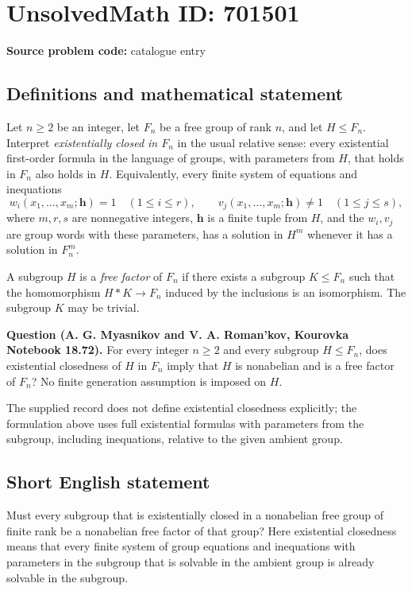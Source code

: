\documentclass[11pt]{article}
\begin{document}
\section*{UnsolvedMath ID: 701501}
\textbf{Source problem code:} catalogue entry
\subsection{Definitions and mathematical statement}
Let \(n\geq 2\) be an integer, let \(F_n\) be a free group of rank \(n\), and let \(H\leq F_n\). Interpret \emph{existentially closed in \(F_n\)} in the usual relative sense: every existential first-order formula in the language of groups, with parameters from \(H\), that holds in \(F_n\) also holds in \(H\). Equivalently, every finite system of equations and inequations
\[
 w_i(x_1,\ldots,x_m;\mathbf h)=1\quad(1\leq i\leq r),\qquad
 v_j(x_1,\ldots,x_m;\mathbf h)\neq 1\quad(1\leq j\leq s),
\]
where \(m,r,s\) are nonnegative integers, \(\mathbf h\) is a finite tuple from \(H\), and the \(w_i,v_j\) are group words with these parameters, has a solution in \(H^m\) whenever it has a solution in \(F_n^m\).

A subgroup \(H\) is a \emph{free factor} of \(F_n\) if there exists a subgroup \(K\leq F_n\) such that the homomorphism \(H*K\to F_n\) induced by the inclusions is an isomorphism. The subgroup \(K\) may be trivial.

\textbf{Question (A. G. Myasnikov and V. A. Roman'kov, Kourovka Notebook 18.72).} For every integer \(n\geq 2\) and every subgroup \(H\leq F_n\), does existential closedness of \(H\) in \(F_n\) imply that \(H\) is nonabelian and is a free factor of \(F_n\)? No finite generation assumption is imposed on \(H\).

The supplied record does not define existential closedness explicitly; the formulation above uses full existential formulas with parameters from the subgroup, including inequations, relative to the given ambient group.
\subsection{Short English statement}
Must every subgroup that is existentially closed in a nonabelian free group of finite rank be a nonabelian free factor of that group? Here existential closedness means that every finite system of group equations and inequations with parameters in the subgroup that is solvable in the ambient group is already solvable in the subgroup.
\end{document}
